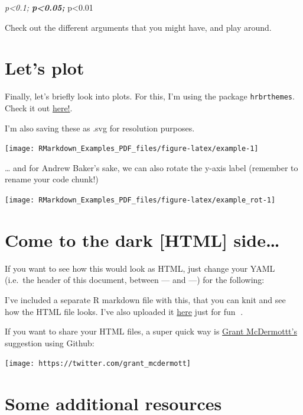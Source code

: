 \documentclass[
]{article}
\begin{document}
\emph{p\textless0.1; \textbf{p\textless0.05; }}p\textless0.01

Check out the different arguments that you might have, and play around.

\hypertarget{lets-plot}{%
\section{Let's plot}\label{lets-plot}}

Finally, let's briefly look into plots. For this, I'm using the package
\texttt{hrbrthemes}. Check it out
\href{https://github.com/hrbrmstr/hrbrthemes}{here!}.

I'm also saving these as .svg for resolution purposes.

\begin{center}\texttt{[image: RMarkdown\_Examples\_PDF\_files/figure-latex/example-1]} \end{center}

\ldots{} and for Andrew Baker's sake, we can also rotate the y-axis
label (remember to rename your code chunk!)

\begin{center}\texttt{[image: RMarkdown\_Examples\_PDF\_files/figure-latex/example\_rot-1]} \end{center}

\hypertarget{come-to-the-dark-html-side}{%
\section{Come to the dark {[}HTML{]}
side\ldots{}}\label{come-to-the-dark-html-side}}

If you want to see how this would look as HTML, just change your YAML
(i.e.~the header of this document, between --- and ---) for the
following:

I've included a separate R markdown file with this, that you can knit
and see how the HTML file looks. I've also uploaded it \href{}{here}
just for fun 🥳.

If you want to share your HTML files, a super quick way is
\href{https://twitter.com/grant_mcdermott}{Grant McDermottt's}
suggestion using Github:

\texttt{[image: https://twitter.com/grant\_mcdermott]}

\hypertarget{some-additional-resources}{%
\section{Some additional resources}\label{some-additional-resources}}
\end{document}
